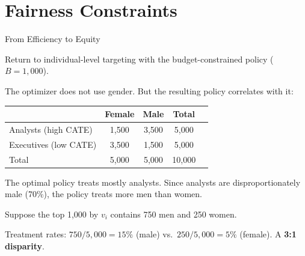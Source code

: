 \documentclass[aspectratio=169, 11pt, handout]{beamer}
\begin{document}
 
\section{Fairness Constraints}
 
\begin{frame}{From Efficiency to Equity}
 
Return to individual-level targeting with the budget-constrained policy ($B = 1{,}000$).
 
\bigskip
 
The optimizer does not use gender. But the resulting policy correlates with it:
 
\begin{center}
\begin{tabular}{lcccc}
\toprule
& \textbf{Female} & \textbf{Male} & \textbf{Total} \\
\midrule
Analysts (high CATE) & 1,500 & 3,500 & 5,000 \\
Executives (low CATE) & 3,500 & 1,500 & 5,000 \\
\midrule
Total & 5,000 & 5,000 & 10,000 \\
\bottomrule
\end{tabular}
\end{center}
 
\pause
\bigskip
 
The optimal policy treats mostly analysts. Since analysts are disproportionately male (70\%), the policy treats more men than women.
 
\medskip
 
Suppose the top 1,000 by $v_i$ contains 750 men and 250 women.
 
Treatment rates: $750/5{,}000 = 15\%$ (male) vs.\ $250/5{,}000 = 5\%$ (female). A \textbf{3:1 disparity}.
 
\end{frame}
 
\end{document}
